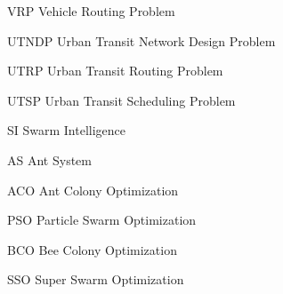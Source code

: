\begin{abbrv}
\item[VRP] Vehicle Routing Problem
\item[UTNDP] Urban Transit Network Design Problem
\item[UTRP] Urban Transit Routing Problem
\item[UTSP] Urban Transit Scheduling Problem
\item[SI] Swarm Intelligence
\item[AS] Ant System
\item[ACO] Ant Colony Optimization
\item[PSO] Particle Swarm Optimization
\item[BCO] Bee Colony Optimization
\item[SSO] Super Swarm Optimization
\end{abbrv}
 
 

 
 
 
 
